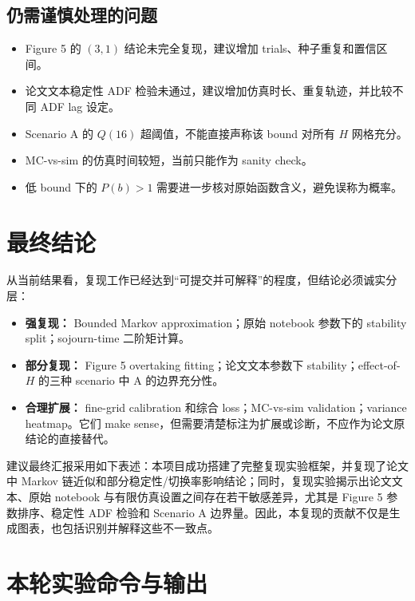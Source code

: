 \documentclass[UTF8,a4paper,11pt]{ctexart}
\begin{document}
\subsection{仍需谨慎处理的问题}

\begin{itemize}
  \item Figure 5 的 $(3,1)$ 结论未完全复现，建议增加 trials、种子重复和置信区间。
  \item 论文文本稳定性 ADF 检验未通过，建议增加仿真时长、重复轨迹，并比较不同 ADF lag 设定。
  \item Scenario A 的 $Q(16)$ 超阈值，不能直接声称该 bound 对所有 $H$ 网格充分。
  \item MC-vs-sim 的仿真时间较短，当前只能作为 sanity check。
  \item 低 bound 下的 $P(b)>1$ 需要进一步核对原始函数含义，避免误称为概率。
\end{itemize}

\section{最终结论}

从当前结果看，复现工作已经达到“可提交并可解释”的程度，但结论必须诚实分层：

\begin{itemize}
  \item \textbf{强复现：} Bounded Markov approximation；原始 notebook 参数下的 stability split；sojourn-time 二阶矩计算。
  \item \textbf{部分复现：} Figure 5 overtaking fitting；论文文本参数下 stability；effect-of-$H$ 的三种 scenario 中 A 的边界充分性。
  \item \textbf{合理扩展：} fine-grid calibration 和综合 loss；MC-vs-sim validation；variance heatmap。它们 make sense，但需要清楚标注为扩展或诊断，不应作为论文原结论的直接替代。
\end{itemize}

建议最终汇报采用如下表述：本项目成功搭建了完整复现实验框架，并复现了论文中 Markov 链近似和部分稳定性/切换率影响结论；同时，复现实验揭示出论文文本、原始 notebook 与有限仿真设置之间存在若干敏感差异，尤其是 Figure 5 参数排序、稳定性 ADF 检验和 Scenario A 边界量。因此，本复现的贡献不仅是生成图表，也包括识别并解释这些不一致点。

\appendix
\section{本轮实验命令与输出}
\end{document}
